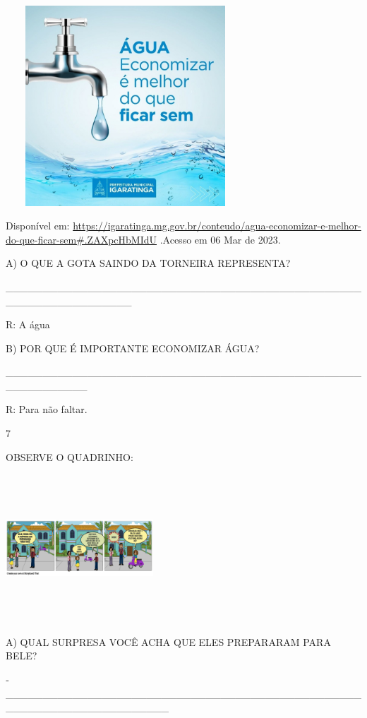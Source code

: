 {{\includegraphics[width=3.52778in,height=2.95347in]{media/image133.jpeg}

Disponível em:
\url{https://igaratinga.mg.gov.br/conteudo/agua-economizar-e-melhor-do-que-ficar-sem\#.ZAXpcHbMIdU}
.Acesso em 06 Mar de 2023.

A) O QUE A GOTA SAINDO DA TORNEIRA REPRESENTA?

\_\_\_\_\_\_\_\_\_\_\_\_\_\_\_\_\_\_\_\_\_\_\_\_\_\_\_\_\_\_\_\_\_\_\_\_\_\_\_\_\_\_\_\_\_\_\_\_\_\_\_\_\_\_\_\_\_\_\_\_\_\_\_\_\_

R: A água

B) POR QUE É IMPORTANTE ECONOMIZAR ÁGUA?

\_\_\_\_\_\_\_\_\_\_\_\_\_\_\_\_\_\_\_\_\_\_\_\_\_\_\_\_\_\_\_\_\_\_\_\_\_\_\_\_\_\_\_\_\_\_\_\_\_\_\_\_\_\_\_\_\_\_\_

R: Para não faltar.

\num{7}

OBSERVE O QUADRINHO:

\includegraphics[width=2.17917in,height=2.18750in]{media/image129.png}

A) QUAL SURPRESA VOCÊ ACHA QUE ELES PREPARARAM PARA BELE?

­­­­­­­­­­­­­­­­­­­­­­­\_\_\_\_\_\_\_\_\_\_\_\_\_\_\_\_\_\_\_\_\_\_\_\_\_\_\_\_\_\_\_\_\_\_\_\_\_\_\_\_\_\_\_\_\_\_\_\_\_\_\_\_\_\_\_\_\_\_\_\_\_\_\_\_\_\_\_\_\_\_

}}
